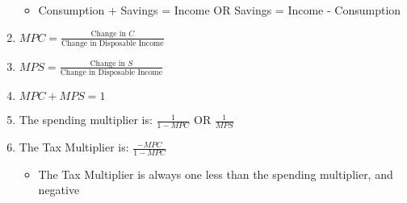 \documentclass[12pt]{article}
\begin{document}
\begin{enumerate}
    \begin{itemize}

      \item Consumption + Savings = Income OR Savings = Income - Consumption

    \end{itemize}

  \item $MPC = \frac{\text{Change in } C}{\text{Change in Disposable Income}}$

  \item $MPS = \frac{\text{Change in } S}{\text{Change in Disposable Income}}$

  \item $MPC + MPS = 1$

  \item The spending multiplier is: $\frac{1}{1-MPC}$ OR $\frac{1}{MPS}$

  \item The Tax Multiplier is: $\frac{-MPC}{1-MPC}$

    \begin{itemize}

      \item The Tax Multiplier is always one less than the spending multiplier, and negative

    \end{itemize}

\end{enumerate}
\end{document}
